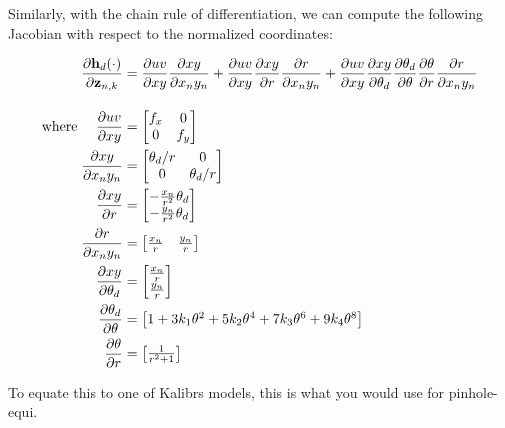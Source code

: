 Similarly, with the chain rule of differentiation, we can compute the following Jacobian with respect to the normalized coordinates\+:

\begin{align*} \frac{\partial \mathbf h_d(\cdot)}{\partial \mathbf{z}_{n,k}} &= \frac{\partial uv}{\partial xy}\frac{\partial xy}{\partial x_ny_n}+ \frac{\partial uv}{\partial xy}\frac{\partial xy}{\partial r}\frac{\partial r}{\partial x_ny_n}+ \frac{\partial uv}{\partial xy}\frac{\partial xy}{\partial \theta_d}\frac{\partial \theta_d}{\partial \theta}\frac{\partial \theta}{\partial r}\frac{\partial r}{\partial x_ny_n} \\[1em] \empty {\rm where}~~~~ \frac{\partial uv}{\partial xy} &= \begin{bmatrix} f_x & 0 \\ 0 & f_y \end{bmatrix} \\ \empty \frac{\partial xy}{\partial x_ny_n} &= \begin{bmatrix} \theta_d/r & 0 \\ 0 & \theta_d/r \end{bmatrix} \\ \empty \frac{\partial xy}{\partial r} &= \begin{bmatrix} -\frac{x_n}{r^2}\theta_d \\ -\frac{y_n}{r^2}\theta_d \end{bmatrix} \\ \empty \frac{\partial r}{\partial x_ny_n} &= \begin{bmatrix} \frac{x_n}{r} & \frac{y_n}{r} \end{bmatrix} \\ \empty \frac{\partial xy}{\partial \theta_d} &= \begin{bmatrix} \frac{x_n}{r} \\ \frac{y_n}{r} \end{bmatrix} \\ \empty \frac{\partial \theta_d}{\partial \theta} &= \begin{bmatrix} 1 + 3k_1 \theta^2 + 5k_2 \theta^4 + 7k_3 \theta^6 + 9k_4 \theta^8\end{bmatrix} \\ \empty \frac{\partial \theta}{\partial r} &= \begin{bmatrix} \frac{1}{r^2+1} \end{bmatrix} \end{align*}

To equate this to one of Kalibr\textquotesingle{}s models, this is what you would use for {\ttfamily pinhole-\/equi}. 

